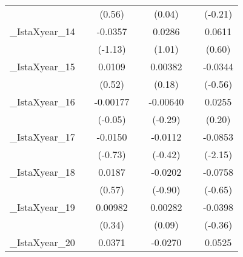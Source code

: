 {\begin{tabular}{l*{6}{c}}
            &                     &      (0.56)         &                     &      (0.04)         &                     &     (-0.21)         \\
[1em]
\_IstaXyear\_14&                     &     -0.0357         &                     &      0.0286         &                     &      0.0611         \\
            &                     &     (-1.13)         &                     &      (1.01)         &                     &      (0.60)         \\
[1em]
\_IstaXyear\_15&                     &      0.0109         &                     &     0.00382         &                     &     -0.0344         \\
            &                     &      (0.52)         &                     &      (0.18)         &                     &     (-0.56)         \\
[1em]
\_IstaXyear\_16&                     &    -0.00177         &                     &    -0.00640         &                     &      0.0255         \\
            &                     &     (-0.05)         &                     &     (-0.29)         &                     &      (0.20)         \\
[1em]
\_IstaXyear\_17&                     &     -0.0150         &                     &     -0.0112         &                     &     -0.0853\sym{*}  \\
            &                     &     (-0.73)         &                     &     (-0.42)         &                     &     (-2.15)         \\
[1em]
\_IstaXyear\_18&                     &      0.0187         &                     &     -0.0202         &                     &     -0.0758         \\
            &                     &      (0.57)         &                     &     (-0.90)         &                     &     (-0.65)         \\
[1em]
\_IstaXyear\_19&                     &     0.00982         &                     &     0.00282         &                     &     -0.0398         \\
            &                     &      (0.34)         &                     &      (0.09)         &                     &     (-0.36)         \\
[1em]
\_IstaXyear\_20&                     &      0.0371         &                     &     -0.0270         &                     &      0.0525         \\

\end{tabular}}
